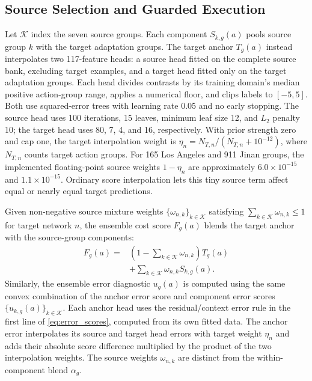 \documentclass[letterpaper,journal]{IEEEtran}
\begin{document}
\subsection{Source Selection and Guarded Execution}
\label{sec:source-selector}
Let $\mathcal K$ index the seven source groups. Each component $S_{k,g}(a)$ pools source group $k$ with the target adaptation groups. The target anchor $T_g(a)$ instead interpolates two 117-feature heads: a source head fitted on the complete source bank, excluding target examples, and a target head fitted only on the target adaptation groups. Each head divides contrasts by its training domain's median positive action-group range, applies a numerical floor, and clips labels to $[-5,5]$. Both use squared-error trees with learning rate 0.05 and no early stopping. The source head uses 100 iterations, 15 leaves, minimum leaf size 12, and $L_2$ penalty 10; the target head uses 80, 7, 4, and 16, respectively. With prior strength zero and cap one, the target interpolation weight is $\eta_n=N_{T,n}/(N_{T,n}+10^{-12})$, where $N_{T,n}$ counts target action groups. For 165 Los Angeles and 911 Jinan groups, the implemented floating-point source weights $1-\eta_n$ are approximately $6.0\times10^{-15}$ and $1.1\times10^{-15}$. Ordinary score interpolation lets this tiny source term affect equal or nearly equal target predictions.

Given non-negative source mixture weights $\{\omega_{n,k}\}_{k\in\mathcal K}$ satisfying $\sum_{k\in\mathcal K}\omega_{n,k}\leq1$ for target network $n$, the ensemble cost score $F_g(a)$ blends the target anchor with the source-group components:
\begin{equation}
 \begin{split}
 F_g(a)={}&\left(1-\sum_{k\in\mathcal K}\omega_{n,k}\right)T_g(a)\\
 &+\sum_{k\in\mathcal K}\omega_{n,k}S_{k,g}(a).
 \end{split}
 \label{eq:source-mixture}
\end{equation}
Similarly, the ensemble error diagnostic $u_g(a)$ is computed using the same convex combination of the anchor error score and component error scores $\{u_{k,g}(a)\}_{k\in\mathcal K}$. Each anchor head uses the residual/context error rule in the first line of \eqref{eq:error_scores}, computed from its own fitted data. The anchor error interpolates its source and target head errors with target weight $\eta_n$ and adds their absolute score difference multiplied by the product of the two interpolation weights. The source weights $\omega_{n,k}$ are distinct from the within-component blend $\alpha_g$.
\end{document}
